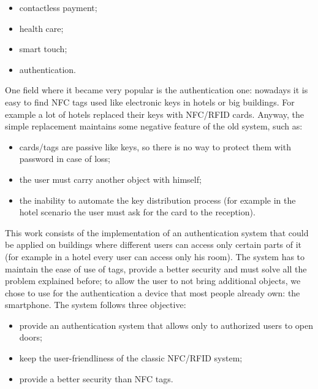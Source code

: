 \documentclass[conference]{IEEEtran}
\begin{document}
\begin{itemize}
 \item contactless payment;
 \item health care;
 \item smart touch;
 \item authentication.
\end{itemize}

One field where it became very popular is the authentication one: nowadays it is easy to find NFC tags used like electronic keys in hotels or big buildings.
For example a lot of hotels replaced their keys with NFC/RFID cards. Anyway, the simple replacement maintains some negative feature of the old system, such as:

\begin{itemize}
 \item cards/tags are passive like keys, so there is no way to protect them with password in case of loss;
 \item the user must carry another object with himself;
 \item the inability to automate the key distribution process (for example in the hotel scenario the user must ask for the card to the reception).
\end{itemize}

This work consists of the implementation of an authentication system that could be applied on buildings where different users can access only certain parts of it (for example in a hotel every user can access only his room). The system has to maintain the ease of use of tags, provide a better security and must solve all the problem explained before; to allow the user to not bring additional objects, we chose to use for the authentication a device that most people already own: the smartphone.
The system follows three objective:

\begin{itemize}
 \item provide an authentication system that allows only to authorized users to open doors;
 \item keep the user-friendliness of the classic NFC/RFID system;
 \item provide a better security than NFC tags.
\end{itemize}
\end{document}
